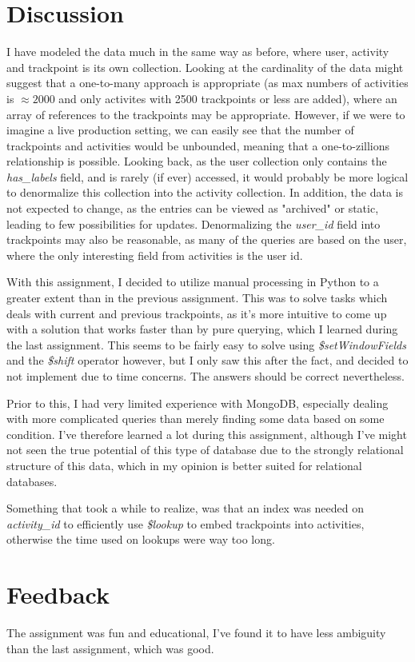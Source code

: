 \documentclass[12pt, titlepage]{report}
\begin{document}
\section*{Discussion}
I have modeled the data much in the same way as before, where user, activity and trackpoint is its own collection. Looking at the cardinality of the data might suggest that a one-to-many approach is appropriate (as max numbers of activities is $\approx 2000$ and only activites with 2500 trackpoints or less are added), where an array of references to the trackpoints may be appropriate. However, if we were to imagine a live production setting, we can easily see that the number of trackpoints and activities would be unbounded, meaning that a one-to-zillions relationship is possible. Looking back, as the user collection only contains the \emph{has\_labels} field, and is rarely (if ever) accessed, it would probably be more logical to denormalize this collection into the activity collection. In addition, the data is not expected to change, as the entries can be viewed as "archived" or static, leading to few possibilities for updates. Denormalizing the \emph{user\_id} field into trackpoints may also be reasonable, as many of the queries are based on the user, where the only interesting field from activities is the user id.

With this assignment, I decided to utilize manual processing in Python to a greater extent than in the previous assignment. This was to solve tasks which deals with current and previous trackpoints, as it's more intuitive to come up with a solution that works faster than by pure querying, which I learned during the last assignment. This seems to be fairly easy to solve using \emph{\$setWindowFields} and the \emph{\$shift} operator however, but I only saw this after the fact, and decided to not implement due to time concerns. The answers should be correct nevertheless.
 
Prior to this, I had very limited experience with MongoDB, especially dealing with more complicated queries than merely finding some data based on some condition. I've therefore learned a lot during this assignment, although I've might not seen the true potential of this type of database due to the strongly relational structure of this data, which in my opinion is better suited for relational databases.

Something that took a while to realize, was that an index was needed on \emph{activity\_id} to efficiently use \emph{\$lookup} to embed trackpoints into activities, otherwise the time used on lookups were way too long.

\section*{Feedback}
The assignment was fun and educational, I've found it to have less ambiguity than the last assignment, which was good.
\end{document}
